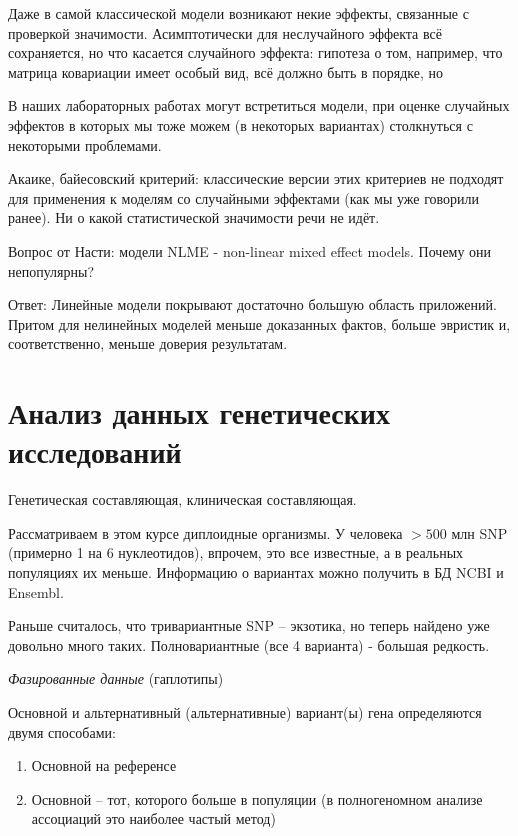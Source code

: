 \documentclass[main.tex]{subfiles}
\begin{document}
Даже в самой классической модели возникают некие эффекты, связанные с проверкой значимости.
Асимптотически для неслучайного эффекта всё сохраняется, но что касается случайного эффекта: гипотеза о том, например, что матрица ковариации имеет особый вид, всё должно быть в порядке, но %

\begin{leftbar}
В наших лабораторных работах могут встретиться модели, при оценке случайных эффектов в которых мы тоже можем (в некоторых вариантах) столкнуться с некоторыми проблемами.
\end{leftbar}


Акаике, байесовский критерий: классические версии этих критериев не подходят для применения к моделям со случайными эффектами (как мы уже говорили ранее).
Ни о какой статистической значимости речи не идёт.

\begin{leftbar}
Вопрос от Насти: модели NLME - non-linear mixed effect models.
Почему они непопулярны?

Ответ:
Линейные модели покрывают достаточно большую область приложений.
Притом для нелинейных моделей меньше доказанных фактов, больше эвристик и, соответственно, меньше доверия результатам.
\end{leftbar}

\section{Анализ данных генетических исследований}

Генетическая составляющая, клиническая составляющая.

Рассматриваем в этом курсе диплоидные организмы.
У человека $ > 500 $ млн SNP (примерно 1 на 6 нуклеотидов), впрочем, это все известные, а в реальных популяциях их меньше.
Информацию о вариантах можно получить в БД NCBI и Ensembl.

Раньше считалось, что тривариантные SNP -- экзотика, но теперь найдено уже довольно много таких.
Полновариантные (все 4 варианта) - большая редкость.


\emph{Фазированные данные} (гаплотипы) %

Основной и альтернативный (альтернативные) вариант(ы) гена определяются двумя способами:

\begin{enumerate}[noitemsep]
	\item Основной на референсе
	\item Основной -- тот, которого больше в популяции (в полногеномном анализе ассоциаций это наиболее частый метод)
\end{enumerate}
\end{document}
